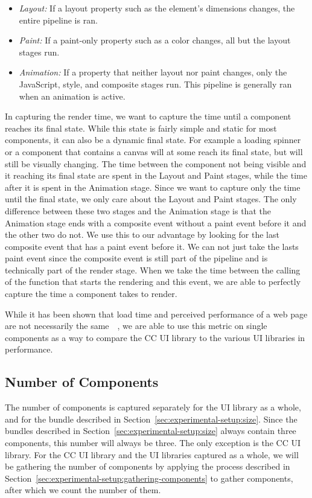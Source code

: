 \begin{itemize}
	\item \emph{Layout:} If a layout property such as the element's dimensions changes, the entire pipeline is ran.
	\item \emph{Paint:} If a paint-only property such as a color changes, all but the layout stages run.
	\item \emph{Animation:} If a property that neither layout nor paint changes, only the JavaScript, style, and composite stages run. This pipeline is generally ran when an animation is active.
\end{itemize}

In capturing the render time, we want to capture the time until a component reaches its final state. While this state is fairly simple and static for most components, it can also be a dynamic final state. For example a loading spinner or a component that contains a canvas will at some reach its final state, but will still be visually changing. The time between the component not being visible and it reaching its final state are spent in the Layout and Paint stages, while the time after it is spent in the Animation stage. Since we want to capture only the time until the final state, we only care about the Layout and Paint stages. The only difference between these two stages and the Animation stage is that the Animation stage ends with a composite event without a paint event before it and the other two do not. We use this to our advantage by looking for the last composite event that has a paint event before it. We can not just take the lasts paint event since the composite event is still part of the pipeline and is technically part of the render stage. When we take the time between the calling of the function that starts the rendering and this event, we are able to perfectly capture the time a component takes to render.

While it has been shown that load time and perceived performance of a web page are not necessarily the same~\cite{nathan2018measuring}~\cite{gao2017perceived}, we are able to use this metric on single components as a way to compare the CC UI library to the various UI libraries in performance.


\subsection{Number of Components}
The number of components is captured separately for the UI library as a whole, and for the bundle described in Section~\ref{sec:experimental-setup:size}. Since the bundles described in Section~\ref{sec:experimental-setup:size} always contain three components, this number will always be three. The only exception is the CC UI library. For the CC UI library and the UI libraries captured as a whole, we will be gathering the number of components by applying the process described in Section~\ref{sec:experimental-setup:gathering-components} to gather components, after which we count the number of them.